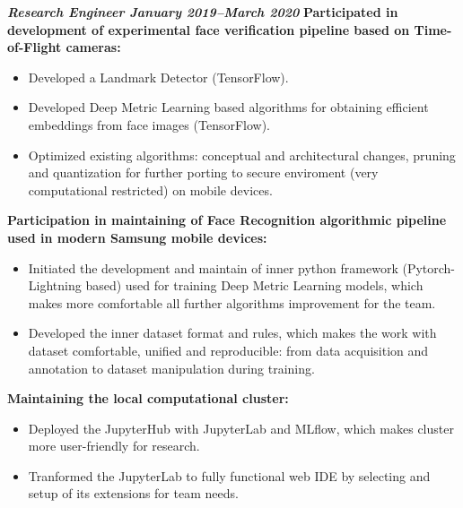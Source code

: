 \documentclass[10pt,a4paper,sans]{moderncv}
\begin{document}
\begin{itemize}
{{\normalsize{\textbf{\textit{Research Engineer \hfill January 2019--March 2020}}} \newline 
\small{\textbf{Participated in development of experimental face verification pipeline based on Time-of-Flight cameras:}}\newline 
\begin{itemize}
	\item Developed a Landmark Detector (TensorFlow).
	\item Developed Deep Metric Learning based algorithms for obtaining efficient embeddings from face images (TensorFlow).
	\item Optimized existing algorithms: conceptual and architectural changes, pruning and quantization for further porting to secure enviroment (very computational restricted) on mobile devices.
\end{itemize}
\vspace{10pt}
\small{\textbf{Participation in maintaining of Face Recognition algorithmic pipeline used in modern Samsung mobile devices:}}\newline 
\begin{itemize}
	\item Initiated the development and maintain of inner python framework (Pytorch-Lightning based) used for training Deep Metric Learning models, which makes more comfortable all further algorithms improvement for the team.
    \item Developed the inner dataset format and rules, which makes the work with dataset comfortable, unified and reproducible: from data acquisition and annotation to dataset manipulation during training.
\end{itemize}
\vspace{10pt}
\small{\textbf{Maintaining the local computational cluster:}}\newline 
\begin{itemize}
	\item Deployed the JupyterHub with JupyterLab and MLflow, which makes cluster more user-friendly for research.
	\item Tranformed the JupyterLab to fully functional web IDE by selecting and setup of its extensions for team needs.
\end{itemize}
}}

\vspace{6pt}


\end{itemize}
\end{document}
